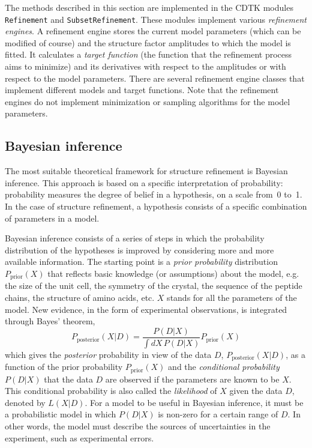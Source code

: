 \documentclass[11pt]{article}
\begin{document}
\begin{sloppy}
The methods described in this section are implemented in the CDTK
modules \texttt{Refinement} and \texttt{SubsetRefinement}. These
modules implement various \textit{refinement engines}. A refinement
engine stores the current model parameters (which can be modified of
course) and the structure factor amplitudes to which the model is
fitted. It calculates a \textit{target function} (the function that
the refinement process aims to minimize) and its derivatives with
respect to the amplitudes or with respect to the model parameters.
There are several refinement engine classes that implement different
models and target functions. Note that the refinement engines do not
implement minimization or sampling algorithms for the model
parameters.

\subsection{Bayesian inference}

The most suitable theoretical framework for structure refinement is
Bayesian inference. This approach is based on a specific
interpretation of probability: probability measures the degree of
belief in a hypothesis, on a scale from~0 to~1. In the case of
structure refinement, a hypothesis consists of a specific combination
of parameters in a model.

Bayesian inference consists of a series of steps in which the
probability distribution of the hypotheses is improved by considering
more and more available information. The starting point is a
\textit{prior probability} distribution $P_{\mbox{prior}}(X)$ that
reflects basic knowledge (or assumptions) about the model, e.g. the
size of the unit cell, the symmetry of the crystal, the sequence of
the peptide chains, the structure of amino acids, etc. $X$ stands for
all the parameters of the model. New evidence, in the form of experimental
observations, is integrated through Bayes' theorem,
\begin{equation}
P_{\mbox{posterior}}(X|D) = \frac{P(D|X)}{\int dX\,P(D|X)} P_{\mbox{prior}}(X)
\end{equation}
which gives the \textit{posterior} probability in view of the data
$D$, $P_{\mbox{posterior}}(X|D)$, as a function of the prior probability
$P_{\mbox{prior}}(X)$ and the \textit{conditional probability} $P(D|X)$
that the data $D$ are observed if the parameters are known to be $X$.
This conditional probability is also called the \textit{likelihood}
of $X$ given the data $D$, denoted by $L(X|D)$. For a model to be
useful in Bayesian inference, it must be a probabilistic model in which
$P(D|X)$ is non-zero for a certain range of $D$. In other words, the model
must describe the sources of uncertainties in the experiment, such as
experimental errors.


\end{sloppy}
\end{document}
